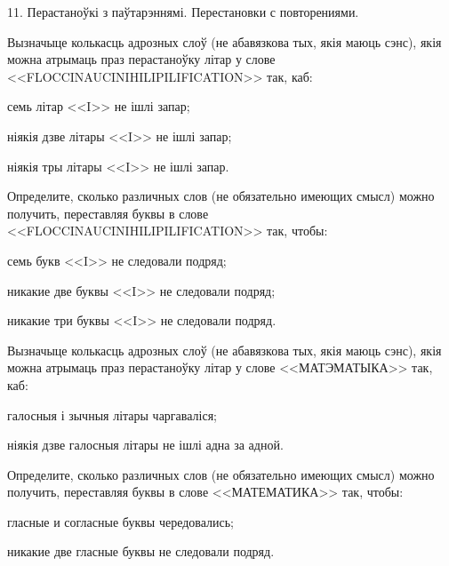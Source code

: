 



\biLangHeader
{11. Перастаноўкі з паўтарэннямі.}
{Перестановки с повторениями.}

\begin{problemList}

\problemItemSimple
{%
Вызначыце колькасць адрозных слоў (не абавязкова тых, якія маюць сэнс), якія можна атрымаць
праз перастаноўку літар у слове <<FLOCCINAUCINIHILIPILIFICATION>> так, каб:
\begin{belarusianEnumerate}
    \item семь літар <<I>> не ішлі запар;
    \item ніякія дзве літары <<I>> не ішлі запар;
    \item ніякія тры літары <<I>> не ішлі запар.
\end{belarusianEnumerate}
}
{%
Определите, сколько различных слов (не обязательно имеющих смысл) можно
получить, переставляя буквы в слове <<FLOCCINAUCINIHILIPILIFICATION>>
так, чтобы:
\begin{russianEnumerate}
    \item семь букв <<I>> не следовали подряд;
    \item никакие две буквы <<I>> не следовали подряд;
    \item никакие три буквы <<I>> не следовали подряд.
\end{russianEnumerate}
}

\bigskip

\problemItemSimple
{%
Вызначыце колькасць адрозных слоў (не абавязкова тых, якія маюць сэнс), якія можна атрымаць
праз перастаноўку літар у слове <<МАТЭМАТЫКА>> так, каб:
\begin{belarusianEnumerate}
    \item галосныя і зычныя літары чаргаваліся;
    \item ніякія дзве галосныя літары не ішлі адна за адной.
\end{belarusianEnumerate}
}
{%
Определите, сколько различных слов (не обязательно имеющих смысл) можно
получить, переставляя буквы в слове <<МАТЕМАТИКА>>
так, чтобы:
\begin{russianEnumerate}
    \item гласные и согласные буквы чередовались;
    \item никакие две гласные буквы не следовали подряд.
\end{russianEnumerate}
}

\bigskip


\end{problemList}
